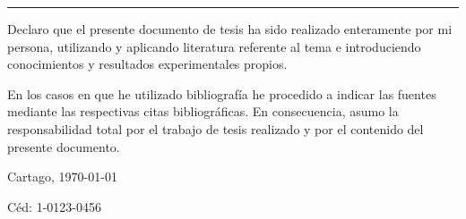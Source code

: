 \thispagestyle{empty}

\rule{10mm}{0pt}

\vfill

Declaro que el presente documento de tesis ha sido realizado enteramente
por mi persona, utilizando y aplicando literatura referente al tema e
introduciendo conocimientos y resultados experimentales propios.

En los casos en que he utilizado bibliografía he procedido a indicar las
fuentes mediante las respectivas citas bibliográficas.  En consecuencia,
asumo la responsabilidad total por el trabajo de tesis realizado y por
el contenido del presente documento.



\vspace*{8mm}

\begin{flushright}
  \scriptAuthor\par
  Cartago, \today\par
  Céd: 1-0123-0456
\end{flushright}

\cleardoublepage

